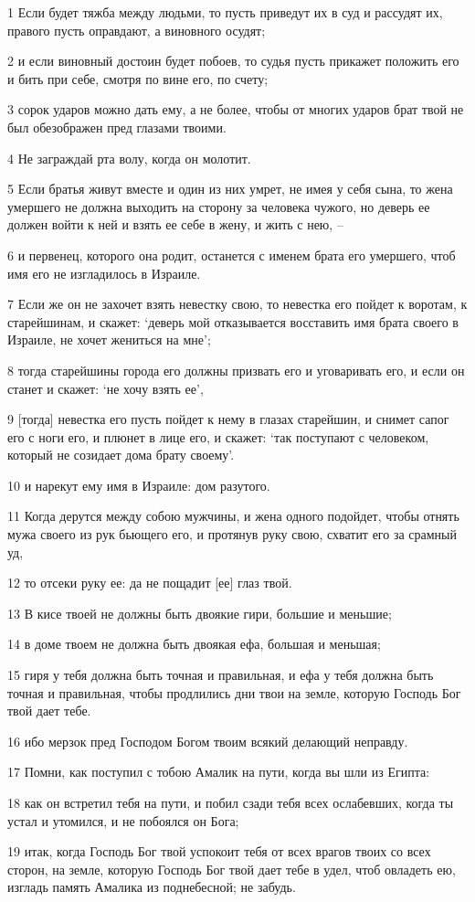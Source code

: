 \par 1 Если будет тяжба между людьми, то пусть приведут их в суд и рассудят их, правого пусть оправдают, а виновного осудят;
\par 2 и если виновный достоин будет побоев, то судья пусть прикажет положить его и бить при себе, смотря по вине его, по счету;
\par 3 сорок ударов можно дать ему, а не более, чтобы от многих ударов брат твой не был обезображен пред глазами твоими.
\par 4 Не заграждай рта волу, когда он молотит.
\par 5 Если братья живут вместе и один из них умрет, не имея у себя сына, то жена умершего не должна выходить на сторону за человека чужого, но деверь ее должен войти к ней и взять ее себе в жену, и жить с нею, --
\par 6 и первенец, которого она родит, останется с именем брата его умершего, чтоб имя его не изгладилось в Израиле.
\par 7 Если же он не захочет взять невестку свою, то невестка его пойдет к воротам, к старейшинам, и скажет: `деверь мой отказывается восставить имя брата своего в Израиле, не хочет жениться на мне';
\par 8 тогда старейшины города его должны призвать его и уговаривать его, и если он станет и скажет: `не хочу взять ее',
\par 9 [тогда] невестка его пусть пойдет к нему в глазах старейшин, и снимет сапог его с ноги его, и плюнет в лице его, и скажет: `так поступают с человеком, который не созидает дома брату своему'.
\par 10 и нарекут ему имя в Израиле: дом разутого.
\par 11 Когда дерутся между собою мужчины, и жена одного подойдет, чтобы отнять мужа своего из рук бьющего его, и протянув руку свою, схватит его за срамный уд,
\par 12 то отсеки руку ее: да не пощадит [ее] глаз твой.
\par 13 В кисе твоей не должны быть двоякие гири, большие и меньшие;
\par 14 в доме твоем не должна быть двоякая ефа, большая и меньшая;
\par 15 гиря у тебя должна быть точная и правильная, и ефа у тебя должна быть точная и правильная, чтобы продлились дни твои на земле, которую Господь Бог твой дает тебе.
\par 16 ибо мерзок пред Господом Богом твоим всякий делающий неправду.
\par 17 Помни, как поступил с тобою Амалик на пути, когда вы шли из Египта:
\par 18 как он встретил тебя на пути, и побил сзади тебя всех ослабевших, когда ты устал и утомился, и не побоялся он Бога;
\par 19 итак, когда Господь Бог твой успокоит тебя от всех врагов твоих со всех сторон, на земле, которую Господь Бог твой дает тебе в удел, чтоб овладеть ею, изгладь память Амалика из поднебесной; не забудь.

